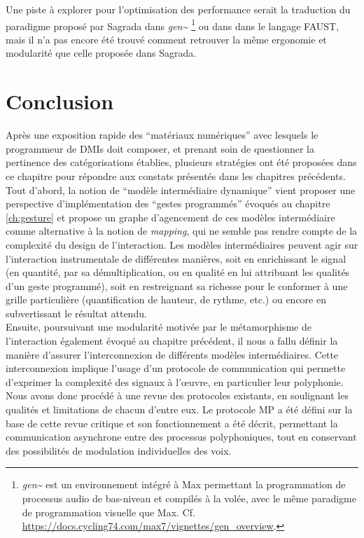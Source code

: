\indent Une piste à explorer pour l'optimisation des performance serait la traduction du paradigme proposé par Sagrada dans \textit{gen\textasciitilde{ }}\footnote{\textit{gen\textasciitilde{ }} est un environnement intégré à Max permettant la programmation de processus audio de bas-niveau et compilés à la volée, avec le même paradigme de programmation visuelle que Max. Cf. \url{https://docs.cycling74.com/max7/vignettes/gen_overview}.} ou dans dans le langage \gls{FAUST}, mais il n'a pas encore été trouvé comment retrouver la même ergonomie et modularité que celle proposée dans Sagrada.


\section{Conclusion}

\noindent Après une exposition rapide des ``matériaux numériques'' avec lesquels le programmeur de \glspl{DMI} doit composer, et prenant soin de questionner la pertinence des catégorisations établies, plusieurs stratégies ont été proposées dans ce chapitre pour répondre aux constats présentés dans les chapitres précédents.\\
\indent Tout d'abord, la notion de ``modèle intermédiaire dynamique'' vient proposer une perspective d'implémentation des ``gestes programmés'' évoqués au chapitre \ref{ch:gesture} et propose un graphe d'agencement de ces modèles intermédiaire comme alternative à la notion de \textit{mapping}, qui ne semble pas rendre compte de la complexité du design de l'interaction. Les modèles intermédiaires peuvent agir sur l'interaction instrumentale de différentes manières, soit en enrichissant le signal (en quantité, par sa démultiplication, ou en qualité en lui attribuant les qualités d'un geste programmé), soit en restreignant sa richesse pour le conformer à une grille particulière (quantification de hauteur, de rythme, etc.) ou encore en subvertissant le résultat attendu.\\
\indent Ensuite, poursuivant une modularité motivée par le métamorphisme de l'interaction également évoqué au chapitre précédent, il nous a fallu définir la manière d'assurer l'interconnexion de différents modèles intermédiaires. Cette interconnexion implique l'usage d'un protocole de communication qui permette d'exprimer la complexité des signaux à l'œuvre, en particulier leur polyphonie. Nous avons donc procédé à une revue des protocoles existants, en soulignant les qualités et limitations de chacun d'entre eux. Le protocole MP a été défini sur la base de cette revue critique et son fonctionnement a été décrit, permettant la communication asynchrone entre des processus polyphoniques, tout en conservant des possibilités de modulation individuelles des voix.\\
